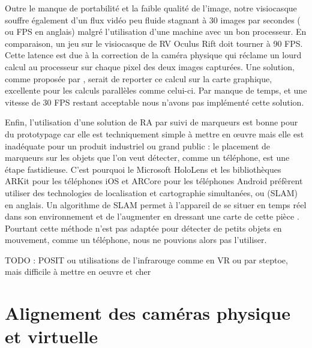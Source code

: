 Outre le manque de portabilité et la faible qualité de l'image, notre visiocasque souffre également d'un flux vidéo peu fluide stagnant à 30 images par secondes ( ou FPS en anglais) malgré l'utilisation d'une machine avec un bon processeur. En comparaison, un jeu sur le visiocasque de RV Oculus Rift doit tourner à 90 FPS. Cette latence est due à la correction de la caméra physique qui réclame un lourd calcul au processeur sur chaque pixel des deux images capturées. Une solution, comme proposée par \cite{Steptoe2013}, serait de reporter ce calcul sur la carte graphique, excellente pour les calculs parallèles comme celui-ci. Par manque de temps, et une vitesse de 30 FPS restant acceptable nous n'avons pas implémenté cette solution.

Enfin, l'utilisation d'une solution de RA par suivi de marqueurs est bonne pour du prototypage car elle est techniquement simple à mettre en \oe uvre mais elle est inadéquate pour un produit industriel ou grand public : le placement de marqueurs sur les objets que l'on veut détecter, comme un téléphone, est une étape fastidieuse. C'est pourquoi le Microsoft HoloLens et les bibliothèques ARKit pour les téléphones iOS et ARCore pour les téléphones Android préfèrent utiliser des technologies de localisation et cartographie simultanées, ou  (SLAM) en anglais. Un algorithme de SLAM permet à l'appareil de se situer en temps réel dans son environnement et de l'augmenter en dressant une carte de cette pièce . Pourtant cette méthode n'est pas adaptée pour détecter de petits objets en mouvement, comme un téléphone, nous ne pouvions alors pas l'utiliser.

TODO : POSIT ou utilisations de l'infrarouge comme en VR ou par steptoe, mais difficile à mettre en oeuvre et cher



\section{Alignement des caméras physique et virtuelle}
\label{sec:cameras_alignment}

